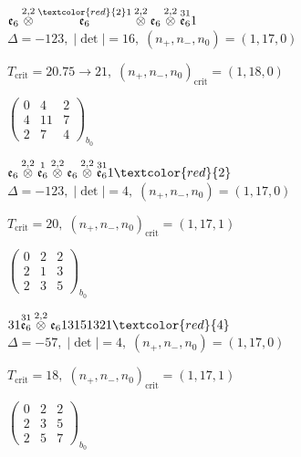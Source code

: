 \documentclass[10pt]{article}
\begin{document}
\smallskip

$\mathfrak{e}_6\overset{2,2}{\otimes}\overset{\textcolor{red}{2}1}{\mathfrak{e}_6}\overset{2,2}{\otimes}\mathfrak{e}_6\overset{2,2}{\otimes}\overset{31}{\mathfrak{e}_6}1$ \quad $\Delta=-123,\; |\det|=16,\; (n_+,n_-,n_0)=(1,17,0)$

\hspace{1em}$T_{\text{crit}}=20.75 \to 21,\; (n_+,n_-,n_0)_{\text{crit}}=(1,18,0)$

\hspace{2em}$\left(\begin{smallmatrix}0 & 4 & 2 \\ 4 & 11 & 7 \\ 2 & 7 & 4\end{smallmatrix}\right)_{\!b_0}$

$\mathfrak{e}_6\overset{2,2}{\otimes}\overset{1}{\mathfrak{e}_6}\overset{2,2}{\otimes}\mathfrak{e}_6\overset{2,2}{\otimes}\overset{31}{\mathfrak{e}_6}1\textcolor{red}{2}$ \quad $\Delta=-123,\; |\det|=4,\; (n_+,n_-,n_0)=(1,17,0)$

\hspace{1em}$T_{\text{crit}}=20,\; (n_+,n_-,n_0)_{\text{crit}}=(1,17,1)$

\hspace{2em}$\left(\begin{smallmatrix}0 & 2 & 2 \\ 2 & 1 & 3 \\ 2 & 3 & 5\end{smallmatrix}\right)_{\!b_0}$

\smallskip

$31\overset{31}{\mathfrak{e}_6}\overset{2,2}{\otimes}\mathfrak{e}_613151321\textcolor{red}{4}$ \quad $\Delta=-57,\; |\det|=4,\; (n_+,n_-,n_0)=(1,17,0)$

\hspace{1em}$T_{\text{crit}}=18,\; (n_+,n_-,n_0)_{\text{crit}}=(1,17,1)$

\hspace{2em}$\left(\begin{smallmatrix}0 & 2 & 2 \\ 2 & 3 & 5 \\ 2 & 5 & 7\end{smallmatrix}\right)_{\!b_0}$
\end{document}
